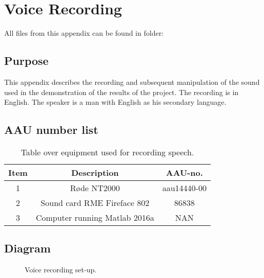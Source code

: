 \section{Voice Recording}

All files from this appendix can be found in folder: \\

\subsection{Purpose}
This appendix describes the recording and subsequent manipulation of the sound used in the demonstration of the results of the project. The recording is in English. The speaker is a man with English as his secondary language. 

\subsection{AAU number list}
\begin{table}[H]
	\centering
	\begin{tabular}{ c c c } \toprule
		{Item}	& {Description} 						& {AAU-no}. \\ \bottomrule 
		1	& Røde NT2000 	& aau14440-00	\\
		2	& Sound card RME Fireface 802	& 86838 		\\
		3	& Computer running Matlab 2016a	 & 	NAN	\\
		\bottomrule
	\end{tabular}
	\caption{Table over equipment used for recording speech.}
	\label{tab:VoiceRec}
\end{table}

\subsection{Diagram}
\begin{figure}[H]
	\centering
	\caption{Voice recording set-up.}
	\label{fig:VoiceRecording}
\end{figure}

